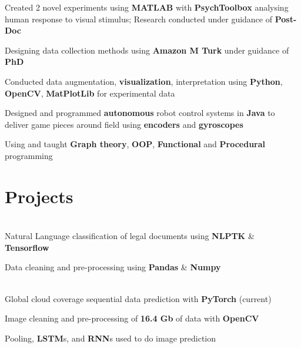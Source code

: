 \documentclass[]{chandan-cv}
\begin{document}
\begin{minipage}[t]{0.71\textwidth}
\begin{tightemize}
	\item Created 2 novel experiments using \textbf{MATLAB} with \textbf{PsychToolbox} analysing human response to visual stimulus; Research conducted under guidance of \textbf{Post-Doc}
	\item Designing data collection methods using \textbf{Amazon M Turk} under guidance of \textbf{PhD}
	\item Conducted data augmentation, \textbf{visualization}, interpretation using \textbf{Python}, \textbf{OpenCV}, \textbf{MatPlotLib} for experimental data
\end{tightemize}
\sectionsep

\begin{tightemize}
	\item Designed and programmed \textbf{autonomous} robot control systems in \textbf{Java} to deliver game pieces around field using \textbf{encoders} and \textbf{gyroscopes}
	\item Using and taught \textbf{Graph theory}, \textbf{OOP}, \textbf{Functional} and \textbf{Procedural} programming
\end{tightemize}
\sectionsep


\section{Projects}

\descript{ }
\location{ }
\\
Natural Language classification of legal documents using \textbf{NLPTK} \& \textbf{Tensorflow}
\begin{tightemize}
        \item Data cleaning and pre-processing using \textbf{Pandas} \& \textbf{Numpy}
\end{tightemize}
\\
Global cloud coverage sequential data prediction with \textbf{PyTorch} (current)
\begin{tightemize}
        \item Image cleaning and pre-processing of \textbf{16.4 Gb} of data with \textbf{OpenCV}
        \item Pooling, \textbf{LSTM}s, and \textbf{RNN}s used to do image prediction
\end{tightemize}
\sectionsep


\end{minipage}
\end{document}
